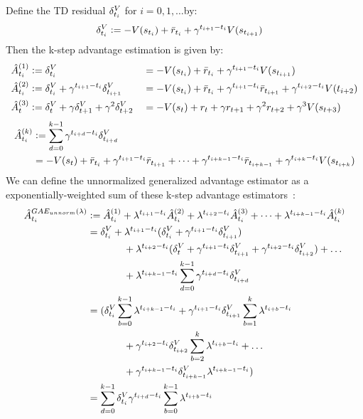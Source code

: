 Define the TD residual $\delta^V_{t_i}$ for $i=0,1, \dots$by:
\begin{align}
\delta^V_{t_i} & \vcentcolon= -V(s_{t_i}) + \bar{r}_{t_i} + \gamma^{t_{i+1}-t_i} V(s_{t_{i+1}})
\end{align}
Then the k-step advantage estimation is given by:
\begin{alignat}{2}
\hat{A}_{t_i}^{(1)} 
& \vcentcolon=   \delta^V_{{t_i}} 
 &&=-V(s_{t_i}) + \bar{r}_{t_i} + \gamma^{t_{i+1}-t_i} V(s_{t_{i+1}})\\
\hat{A}_{t_i}^{(2)} 
&\vcentcolon= \delta^V_{t_i} + \gamma^{t_{i+1}-t_i} \delta^V_{t_{i+1}} 
&&= -V(s_{t_i}) +\bar{r}_{t_i} + \gamma^{t_{i+1}-t_i} \bar{r}_{t_{i+1}} + \gamma^{t_{i+2}-t_i} V(t_{i+2}) \\
\hat{A}_t^{(3)} 
&\vcentcolon= \delta^V_{t} + \gamma \delta^V_{t+1} + \gamma^2 \delta^V_{t+2} 
&&= -V(s_t) + r_t + \gamma r_{t+1} + \gamma^2 r_{t+2} + \gamma^3 V(s_{t+3}) \label{a3}
\end{alignat}
\begin{align}
\begin{split}
\hat{A}_{t_i}^{(k)} 
&\vcentcolon= \sum_{d=0}^{k-1} 
\gamma^{t_{i+d}-t_i} \delta^V_{t_{i+d}} \\
&= -V(s_t) 
+\bar{r}_{t_i} + \gamma^{t_{i+1}-t_i} \bar{r}_{t_{i+1}} 
+ \dots 
+ \gamma^{t_{i+k-1}-t_i} \bar{r}_{t_{i+k-1}} 
+ \gamma^{t_{i+k}-t_i} V(s_{t_{i+k}})
\end{split}
\end{align}
We can define the unnormalized generalized advantage estimator as a exponentially-weighted sum of these k-step advantage estimators~\cite{schulman2015high}:
\begin{align}
\hat{A}_{t_i}^{GAE_{unnorm}(\lambda)}
&\vcentcolon=  \hat{A}_{t_i}^{(1)} + \lambda^{t_{i+1}-t_i}  \hat{A}_{t_i}^{(2)} + \lambda^{t_{i+2}-t_i} \hat{A}_{t_i}^{(3)} + \dots + \lambda^{t_{i+k-1}-t_i} \hat{A}_{t_i}^{(k)} \nonumber \\
&=  \delta^V_{t_i} 
+ \lambda^{t_{i+1}-t_i} (\delta^V_{t_i} + \gamma^{t_{i+1}-t_i} \delta^V_{t_{i+1}} ) \\
&\ \ \ \ \  \ \ \ \ \ \ +\lambda^{t_{i+2}-t_i} (\delta^V_t + \gamma^{t_{i+1}-t_i} \delta^V_{t_{i+1}} + \gamma^{t_{i+2}-t_i} \delta^V_{t_{i+2}}) + \dots \nonumber \\
&\ \ \ \ \  \ \ \ \ \ \ +\lambda^{t_{i+k-1}-t_i}  \sum_{d=0}^{k-1} \gamma^{t_{i+d}-t_i} \delta^V_{t_{i+d}}\\
&= (
\delta^V_{t_i}  \sum_{b=0}^{k-1} \lambda^{t_{i+k-1}-t_i}
+\gamma^{t_{i+1}-t_i} \delta^V_{t_{i+1}} \sum_{b=1}^k \lambda^{t_{i+b}-t_i} \nonumber \\
&\ \ \ \ \  \ \ \ \ \ \ +\gamma^{t_{i+2}-t_i} \delta^V_{t_{i+2}} \sum_{b=2}^k \lambda^{t_{i+b}-t_i}
+\dots \\
&\ \ \ \ \  \ \ \ \ \ \ +\gamma^{t_{i+k-1}-t_i} \delta^V_{t_{i+k-1}} \lambda^{t_{i+k-1}-t_i})
\nonumber \\
&= \sum_{d=0}^{k-1} \delta^V_{t_i} \gamma^{t_{i+d}-t_i} \sum_{b=0}^{k-1} \lambda^{t_{i+b}-t_i}
\label{eq:gaelam1}
\end{align}
